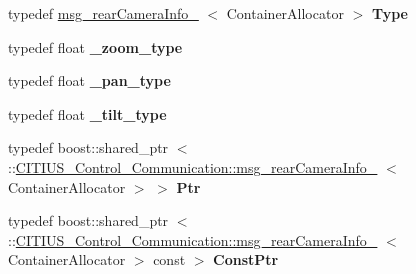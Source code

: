 \begin{DoxyCompactItemize}
\item 
\hypertarget{struct_c_i_t_i_u_s___control___communication_1_1msg__rear_camera_info___a04b3a77bdf47f530d18f1e9a71d8e354}{typedef \hyperlink{struct_c_i_t_i_u_s___control___communication_1_1msg__rear_camera_info__}{msg\-\_\-rear\-Camera\-Info\-\_\-}\*
$<$ \-Container\-Allocator $>$ {\bfseries \-Type}}\label{struct_c_i_t_i_u_s___control___communication_1_1msg__rear_camera_info___a04b3a77bdf47f530d18f1e9a71d8e354}

\item 
\hypertarget{struct_c_i_t_i_u_s___control___communication_1_1msg__rear_camera_info___a29534167f521b9c7b7dc6d1a5adc6ba0}{typedef float {\bfseries \-\_\-zoom\-\_\-type}}\label{struct_c_i_t_i_u_s___control___communication_1_1msg__rear_camera_info___a29534167f521b9c7b7dc6d1a5adc6ba0}

\item 
\hypertarget{struct_c_i_t_i_u_s___control___communication_1_1msg__rear_camera_info___a116c50593c8e42b250ee3286b70bc169}{typedef float {\bfseries \-\_\-pan\-\_\-type}}\label{struct_c_i_t_i_u_s___control___communication_1_1msg__rear_camera_info___a116c50593c8e42b250ee3286b70bc169}

\item 
\hypertarget{struct_c_i_t_i_u_s___control___communication_1_1msg__rear_camera_info___a87d802a721c5913d22d3bb1eb4946c2e}{typedef float {\bfseries \-\_\-tilt\-\_\-type}}\label{struct_c_i_t_i_u_s___control___communication_1_1msg__rear_camera_info___a87d802a721c5913d22d3bb1eb4946c2e}

\item 
\hypertarget{struct_c_i_t_i_u_s___control___communication_1_1msg__rear_camera_info___a929b9aa4c4bd098c663bc7b4953d0f22}{typedef boost\-::shared\-\_\-ptr\*
$<$ \-::\hyperlink{struct_c_i_t_i_u_s___control___communication_1_1msg__rear_camera_info__}{\-C\-I\-T\-I\-U\-S\-\_\-\-Control\-\_\-\-Communication\-::msg\-\_\-rear\-Camera\-Info\-\_\-}\*
$<$ \-Container\-Allocator $>$ $>$ {\bfseries \-Ptr}}\label{struct_c_i_t_i_u_s___control___communication_1_1msg__rear_camera_info___a929b9aa4c4bd098c663bc7b4953d0f22}

\item 
\hypertarget{struct_c_i_t_i_u_s___control___communication_1_1msg__rear_camera_info___ad0e407a81179dc3cd95cb448ebc387b2}{typedef boost\-::shared\-\_\-ptr\*
$<$ \-::\hyperlink{struct_c_i_t_i_u_s___control___communication_1_1msg__rear_camera_info__}{\-C\-I\-T\-I\-U\-S\-\_\-\-Control\-\_\-\-Communication\-::msg\-\_\-rear\-Camera\-Info\-\_\-}\*
$<$ \-Container\-Allocator $>$ const  $>$ {\bfseries \-Const\-Ptr}}\label{struct_c_i_t_i_u_s___control___communication_1_1msg__rear_camera_info___ad0e407a81179dc3cd95cb448ebc387b2}

\end{DoxyCompactItemize}
